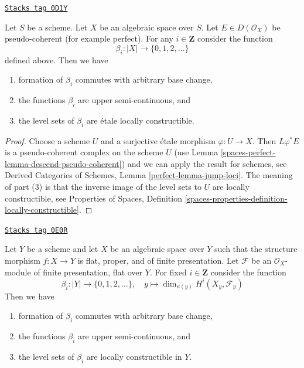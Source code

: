 \begin{lemma}
\label{spaces-perfect-lemma-jump-loci}
\href{https://stacks.math.columbia.edu/tag/0D1Y}{\texttt{Stacks tag 0D1Y}}

Let $S$ be a scheme. Let $X$ be an algebraic space over $S$.
Let $E \in D(\mathcal{O}_X)$ be pseudo-coherent (for example perfect).
For any $i \in \mathbf{Z}$ consider the function
$$
\beta_i : |X| \longrightarrow \{0, 1, 2, \ldots\}
$$
defined above. Then we have
\begin{enumerate}
\item formation of $\beta_i$ commutes with arbitrary base change,
\item the functions $\beta_i$ are upper semi-continuous, and
\item the level sets of $\beta_i$ are \'etale locally constructible.
\end{enumerate}
\end{lemma}

\begin{proof}
Choose a scheme $U$ and a surjective \'etale morphism $\varphi : U \to X$.
Then $L\varphi^*E$ is a pseudo-coherent complex on the scheme $U$ (use
Lemma \ref{spaces-perfect-lemma-descend-pseudo-coherent}) and we can apply the result
for schemes, see
Derived Categories of Schemes, Lemma \ref{perfect-lemma-jump-loci}.
The meaning of part (3) is that the inverse image of the level sets
to $U$ are locally constructible, see
Properties of Spaces, Definition
\ref{spaces-properties-definition-locally-constructible}.
\end{proof}

\begin{lemma}
\label{spaces-perfect-lemma-jump-loci-geometric}
\href{https://stacks.math.columbia.edu/tag/0E0R}{\texttt{Stacks tag 0E0R}}

Let $Y$ be a scheme and let $X$ be an algebraic space over $Y$
such that the structure morphism $f : X \to Y$
is flat, proper, and of finite presentation.
Let $\mathcal{F}$ be an $\mathcal{O}_X$-module of finite presentation,
flat over $Y$. For fixed $i \in \mathbf{Z}$ consider the function
$$
\beta_i : |Y| \to \{0, 1, 2, \ldots\},\quad
y \longmapsto \dim_{\kappa(y)} H^i(X_y, \mathcal{F}_y)
$$
Then we have
\begin{enumerate}
\item formation of $\beta_i$ commutes with arbitrary base change,
\item the functions $\beta_i$ are upper semi-continuous, and
\item the level sets of $\beta_i$ are locally constructible in $Y$.
\end{enumerate}
\end{lemma}

